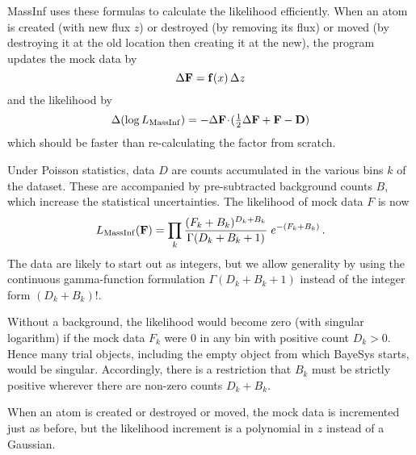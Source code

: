 MassInf uses these formulas to calculate the likelihood efficiently.
When an atom is created (with new flux $z$) or destroyed (by removing its flux) 
or moved (by destroying it at the old location then creating it at the new), the program updates the mock data by
$$
    \Delta{\bf F} = {\bf f}(x)\,\Delta z
$$
and the likelihood by
$$
    \Delta(\log L_{\rm MassInf}) = - \Delta{\bf F}\!\cdot\!(\hbox{$1 \over 2$} \Delta{\bf F} + {\bf F} - {\bf D})
$$
which should be faster than re-calculating the factor from scratch.

\bigskip
{}
\smallskip

Under Poisson statistics, data $D$ are counts accumulated in the various bins $k$ of the dataset.
These are accompanied by pre-subtracted background counts $B$, which increase the statistical uncertainties.
The likelihood of mock data $F$ is now
$$
    L_{\rm MassInf}({\bf F}) = \prod_k {(F_k + B_k)^{D_k + B_k} \over \Gamma(D_k + B_k + 1)}\; e^{-(F_k + B_k)}\,.
$$
The data are likely to start out as integers, 
but we allow generality by using the continuous gamma-function formulation $\Gamma(D_k + B_k + 1)$ instead of the integer form $(D_k + B_k)!$.

Without a background, the likelihood would become zero (with singular logarithm) if the mock data $F_k$ were 0 in any bin with positive count $D_k>0$.
Hence many trial objects, including the empty object from which BayeSys starts, would be singular.
Accordingly, there is a restriction that $B_k$ must be strictly positive wherever there are non-zero counts $D_k + B_k$.

When an atom is created or destroyed or moved, the mock data is incremented just as before, but the likelihood increment is a polynomial in $z$ instead of a Gaussian. 

\bigskip
{}
\smallskip

